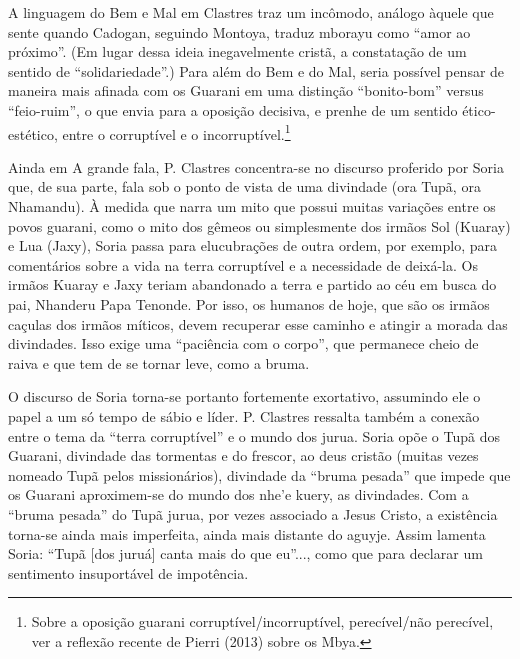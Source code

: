 \documentclass{article}
\begin{document}
A linguagem do Bem e Mal em Clastres traz um inc\^omodo, an\'alogo
\`aquele que sente quando Cadogan, seguindo Montoya, traduz mborayu
como {\textquotedblleft}amor ao pr\'oximo{\textquotedblright}. (Em
lugar dessa ideia inegavelmente crist\~a, a constata\c{c}\~ao de um
sentido de {\textquotedblleft}solidariedade{\textquotedblright}.) Para
al\'em do Bem e do Mal, seria poss\'ivel pensar de maneira mais afinada
com os Guarani em uma distin\c{c}\~ao
{\textquotedblleft}bonito-bom{\textquotedblright} versus
{\textquotedblleft}feio-ruim{\textquotedblright}, o que envia para a
oposi\c{c}\~ao decisiva, e prenhe de um sentido \'etico-est\'etico,
entre o corrupt\'ivel e o incorrupt\'ivel.\footnote{ Sobre a
oposi\c{c}\~ao guarani corrupt\'ivel/incorrupt\'ivel, perec\'ivel/n\~ao
perec\'ivel, ver a reflex\~ao recente de Pierri (2013) sobre os Mbya. }


Ainda em A grande fala, P. Clastres concentra-se no discurso proferido
por Soria que, de sua parte, fala sob o ponto de vista de uma divindade
(ora Tup\~a, ora Nhamandu). \`A medida que narra um mito que possui
muitas varia\c{c}\~oes entre os povos guarani, como o mito dos g\^emeos
ou simplesmente dos irm\~aos Sol (Kuaray) e Lua (Jaxy), Soria passa
para elucubra\c{c}\~oes de outra ordem, por exemplo, para coment\'arios
sobre a vida na terra corrupt\'ivel e a necessidade de deix\'a-la. Os
irm\~aos Kuaray e Jaxy teriam abandonado a terra e partido ao c\'eu em
busca do pai, Nhanderu Papa Tenonde. Por isso, os humanos de hoje, que
s\~ao os irm\~aos ca\c{c}ulas dos irm\~aos m\'iticos, devem recuperar
esse caminho e atingir a morada das divindades. Isso exige uma
{\textquotedblleft}paci\^encia com o corpo{\textquotedblright}, que
permanece cheio de raiva e que tem de se tornar leve, como a bruma. 

O discurso de Soria torna-se portanto fortemente exortativo, assumindo
ele o papel a um s\'o tempo de s\'abio e l\'ider. P. Clastres ressalta
tamb\'em a conex\~ao entre o tema da {\textquotedblleft}terra
corrupt\'ivel{\textquotedblright} e o mundo dos jurua. Soria op\~oe o
Tup\~a dos Guarani, divindade das tormentas e do frescor, ao deus
crist\~ao (muitas vezes nomeado Tup\~a pelos mission\'arios), divindade
da {\textquotedblleft}bruma pesada{\textquotedblright} que impede que
os Guarani aproximem-se do mundo dos nhe{\textquoteright}e kuery, as
divindades. Com a {\textquotedblleft}bruma pesada{\textquotedblright}
do Tup\~a jurua, por vezes associado a Jesus Cristo, a exist\^encia
torna-se ainda mais imperfeita, ainda mais distante do aguyje. Assim
lamenta Soria: {\textquotedblleft}Tup\~a [dos juru\'a] canta mais do
que eu{\textquotedblright}..., como que para declarar um sentimento
insuport\'avel de impot\^encia. 
\end{document}
